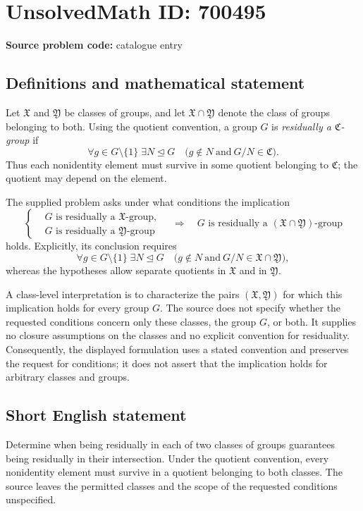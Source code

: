 \documentclass[11pt]{article}
\begin{document}
\section*{UnsolvedMath ID: 700495}
\textbf{Source problem code:} catalogue entry
\subsection{Definitions and mathematical statement}
Let \(\mathfrak X\) and \(\mathfrak Y\) be classes of groups, and let \(\mathfrak X\cap\mathfrak Y\) denote the class of groups belonging to both. Using the quotient convention, a group \(G\) is \emph{residually a \(\mathfrak C\)-group} if
\[
\forall g\in G\setminus\{1\}\;\exists N\trianglelefteq G
\quad\bigl(g\notin N\ \text{and}\ G/N\in\mathfrak C\bigr).
\]
Thus each nonidentity element must survive in some quotient belonging to \(\mathfrak C\); the quotient may depend on the element.

The supplied problem asks under what conditions the implication
\[
\left\{
\begin{aligned}
&G\text{ is residually a }\mathfrak X\text{-group},\\
&G\text{ is residually a }\mathfrak Y\text{-group}
\end{aligned}
\right.
\quad\Longrightarrow\quad
G\text{ is residually a }(\mathfrak X\cap\mathfrak Y)\text{-group}
\]
holds. Explicitly, its conclusion requires
\[
\forall g\in G\setminus\{1\}\;\exists N\trianglelefteq G
\quad\bigl(g\notin N\ \text{and}\ G/N\in\mathfrak X\cap\mathfrak Y\bigr),
\]
whereas the hypotheses allow separate quotients in \(\mathfrak X\) and in \(\mathfrak Y\).

A class-level interpretation is to characterize the pairs \((\mathfrak X,\mathfrak Y)\) for which this implication holds for every group \(G\). The source does not specify whether the requested conditions concern only these classes, the group \(G\), or both. It supplies no closure assumptions on the classes and no explicit convention for residuality. Consequently, the displayed formulation uses a stated convention and preserves the request for conditions; it does not assert that the implication holds for arbitrary classes and groups.
\subsection{Short English statement}
Determine when being residually in each of two classes of groups guarantees being residually in their intersection. Under the quotient convention, every nonidentity element must survive in a quotient belonging to both classes. The source leaves the permitted classes and the scope of the requested conditions unspecified.
\end{document}

